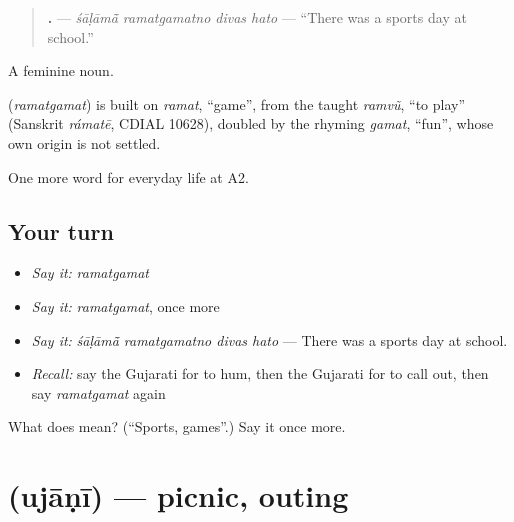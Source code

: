 \begin{quote}
\textbf{   .} — \emph{śāḷāmā̃ ramatgamatno divas hato} — \textquotedblleft{}There was a sports day at school.\textquotedblright{}
\end{quote}

A feminine noun.

\begin{cousinweb}
\textbf{} (\emph{ramatgamat}) is built on \emph{ramat}, \textquotedblleft{}game\textquotedblright{}, from the taught \emph{ramvũ}, \textquotedblleft{}to play\textquotedblright{} (Sanskrit \emph{rámatē}, CDIAL 10628), doubled by the rhyming \emph{gamat}, \textquotedblleft{}fun\textquotedblright{}, whose own origin is not settled.
\end{cousinweb}

\begin{grammarlens}[title={What you've built}]
One more word for everyday life at A2.
\end{grammarlens}

\subsection*{Your turn}
\begin{itemize}
\raggedright
  \item \emph{Say it:} \emph{ramatgamat}
  \item \emph{Say it:} \emph{ramatgamat}, once more
  \item \emph{Say it:} \emph{śāḷāmā̃ ramatgamatno divas hato} — There was a sports day at school.
  \item \emph{Recall:} say the Gujarati for to hum, then the Gujarati for to call out, then say \emph{ramatgamat} again
\end{itemize}

\begin{tcolorbox}[breakable,colback=teal!4,colframe=teal!35!black,title={Before you move on}]
What does  mean? (\textquotedblleft{}Sports, games\textquotedblright{}.) Say it once more.
\end{tcolorbox}
\section[\texorpdfstring{\gu{ઉજાણી} (ujāṇī)}{ઉજાણી (ujāṇī)}]{ (ujāṇī) — picnic, outing}

\label{lesson:GU-C262-ujani}



